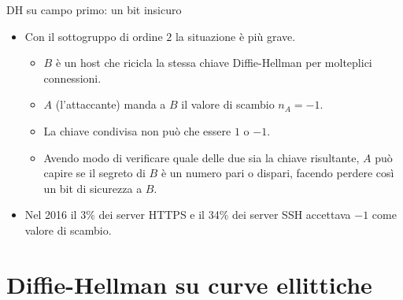 \documentclass[11pt,svgnames,smaller,aspectratio=169,italian]{beamer}
\begin{document}
\begin{frame}{DH su campo primo: un bit insicuro}
	\begin{itemize}
		\item Con il sottogruppo di ordine $2$ la situazione è più grave.
			\begin{itemize}
				\item $B$ è un host che ricicla la stessa chiave Diffie-Hellman per molteplici connessioni.
				\item $A$ (l'attaccante) manda a $B$ il valore di scambio $n_{A} = -1$.
				\item La chiave condivisa non può che essere $1$ o $-1$.
				\item Avendo modo di verificare quale delle due sia la chiave risultante, $A$ può capire se il segreto di $B$ è un numero pari o dispari, facendo perdere così un bit di sicurezza a $B$.
			\end{itemize}
		\item Nel 2016 il 3\% dei server HTTPS e il 34\% dei server SSH accettava $-1$ come valore di scambio.
	\end{itemize}
\end{frame}

\section{Diffie-Hellman su curve ellittiche}
\begin{frame}
	\sectionpage
	\centering
\end{frame}
\end{document}
